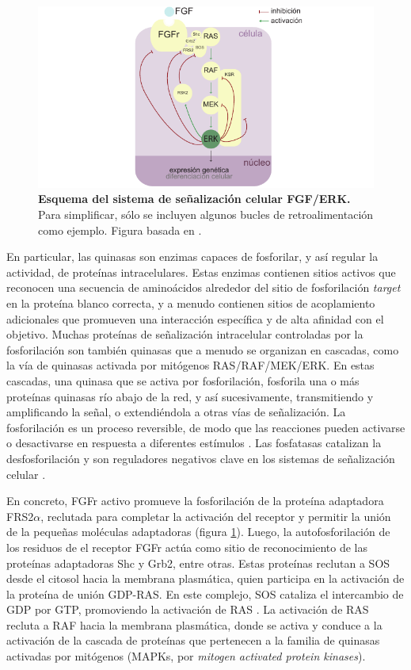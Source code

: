 \documentclass[./main.tex]{subfiles}
\begin{document}
 \begin{figure}
    \centering
    \includegraphics[width=1\columnwidth]{figures/chapter1/C1_FGF-ERK_pathway.pdf} 
    \caption{\textbf{Esquema del sistema de señalización celular FGF/ERK.} Para simplificar, sólo se incluyen algunos bucles de retroalimentación como ejemplo. Figura basada en \cite{Lake2016}.}
    \label{C1_fig:FGF_ERK_pathway}
\end{figure}

En particular, las quinasas son enzimas capaces de fosforilar, y así regular la actividad, de proteínas intracelulares. Estas enzimas contienen sitios activos que reconocen una secuencia de aminoácidos alrededor del sitio de fosforilación \textit{target} en la proteína blanco correcta, y a menudo contienen sitios de acoplamiento adicionales que promueven una interacción específica y de alta afinidad con el objetivo. Muchas proteínas de señalización intracelular controladas por la fosforilación son también quinasas que a menudo se organizan en cascadas, como la vía de quinasas activada por mitógenos RAS/RAF/MEK/ERK. En estas cascadas, una quinasa que se activa por fosforilación, fosforila una o más proteínas quinasas río abajo de la red, y así sucesivamente, transmitiendo y amplificando la señal, o extendiéndola a otras vías de señalización. La fosforilación es un proceso reversible, de modo que las reacciones pueden activarse o desactivarse en respuesta a diferentes estímulos  \cite{Rosen1983,Pawson2005}. Las fosfatasas catalizan la desfosforilación y son reguladores negativos clave en los sistemas de señalización celular \cite{Lemmon2016}.  


En concreto, FGFr activo promueve la fosforilación de la proteína adaptadora FRS2$\alpha$, reclutada para completar la activación del receptor y permitir la unión de la pequeñas moléculas adaptadoras (figura \ref{C1_fig:FGF_ERK_pathway}). Luego, la autofosforilación de los residuos de el receptor FGFr actúa como sitio de reconocimiento de las proteínas adaptadoras Shc y Grb2, entre otras. Estas proteínas reclutan a SOS desde el citosol hacia la membrana plasmática, quien participa en la activación de la proteína de unión GDP-RAS. En este complejo, SOS cataliza el intercambio de GDP por GTP, promoviendo la activación de RAS \cite{Lake2016,Thisse2005,Alberts2008,Lavoie2020}. La activación de RAS recluta a RAF hacia la membrana plasmática, donde se activa y conduce a la activación de la cascada de proteínas que pertenecen a la familia de quinasas activadas por mitógenos (MAPKs, por \textit{mitogen activated protein kinases}). 
\end{document}
